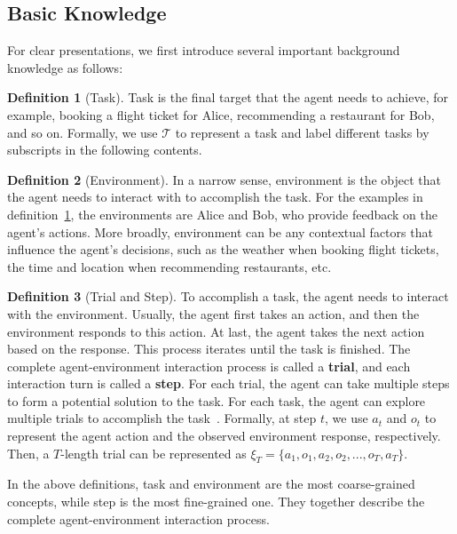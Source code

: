 \documentclass{article}
\theoremstyle{definition}
\newtheorem{definition}{Definition}
\theoremstyle{theorem}
\theoremstyle{proof}
\theoremstyle{remark}
\begin{document}
	\subsection{Basic Knowledge}\label{basic}
	For clear presentations, we first introduce several important background knowledge as follows: 
	
	\begin{definition}[Task]
		\label{task}
		Task is the final target that the agent needs to achieve, for example, booking a flight ticket for Alice, recommending a restaurant for Bob, and so on. Formally, we use $\mathcal{T}$ to represent a task and label different tasks by subscripts in the following contents.
	\end{definition}
	
	\begin{definition}[Environment]
		In a narrow sense, environment is the object that the agent needs to interact with to accomplish the task. 
		For the examples in definition~\ref{task}, the environments are Alice and Bob, who provide feedback on the agent's actions.
		More broadly, environment can be any contextual factors that influence the agent's decisions, such as the weather when booking flight tickets, the time and location when recommending restaurants, etc.
	\end{definition}
	
	\begin{definition}[Trial and Step]
		To accomplish a task, the agent needs to interact with the environment. Usually, the agent first takes an action, and then the environment responds to this action. At last, the agent takes the next action based on the response. This process iterates until the task is finished. The complete agent-environment interaction process is called a \textbf{{trial}}, and each interaction turn is called a \textbf{{step}}.
		For each trial, the agent can take multiple steps to form a potential solution to the task.
		For each task, the agent can explore multiple trials to accomplish the task~\cite {reflexion}.
		Formally, at step $t$, we use $a_t$ and $o_t$ to represent the agent action and the observed environment response, respectively. Then, a $T$-length trial can be represented as $\xi_T = \{a_1,o_1,a_2,o_2, ..., o_T, a_T\}$.
	\end{definition}
	In the above definitions, task and environment are the most coarse-grained concepts, while step is the most fine-grained one. They together describe the complete agent-environment interaction process.
	
\end{document}
